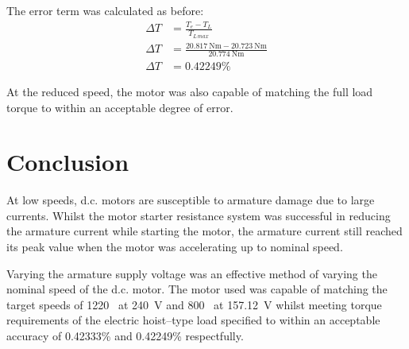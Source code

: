 \documentclass[a4paper,11pt,twocolumn]{article}
\newcommand{\V}{\si{\volt}\xspace}
\newcommand{\Nm}{\si{\newton\metre}\xspace}
\newcommand{\RPM}{\text{RPM}\xspace}
\newcommand{\DC}{d.c.\xspace}
\begin{document}
The error term was calculated as before:
\begin{align*}
    \Delta T &= \frac{T_e - T_L}{T_{L\,max}} \\
    \Delta T &= \frac{20.817~\Nm - 20.723~\Nm}{20.774~\Nm} \\
    \Delta T &= 0.42249\%
\end{align*}

At the reduced speed, the motor was also capable of matching the full load 
torque to within an acceptable degree of error.

\section{Conclusion}

At low speeds, \DC motors are susceptible to armature damage due to large 
currents. Whilst the motor starter resistance system was successful in 
reducing the armature current while starting the motor, the armature current 
still reached its peak value when the motor was accelerating up to nominal 
speed.

Varying the armature supply voltage was an effective method of varying the 
nominal speed of the \DC motor. The motor used was capable of matching the 
target speeds of 1220~\RPM at 240~\V and 800~\RPM at 157.12~\V whilst meeting 
torque requirements of the electric hoist--type load specified to within an 
acceptable accuracy of 0.42333\% and 0.42249\% respectfully.

\printbibliography
\end{document}
